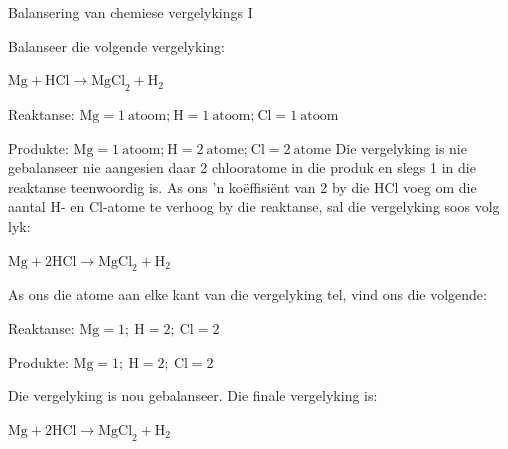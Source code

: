 \begin{wex}{Balansering van chemiese vergelykings I}{Balanseer die volgende vergelyking:
\begin{center}
${\text{Mg} + \text{HCl} \rightarrow \text{MgCl}_{2} + \text{H}_{2}}$\\
\end{center}
}
{

Reaktanse: $\text{Mg} = 1 ~\text{atoom;}~ \text{H} = 1 ~\text{atoom;}~ \text{Cl} = 1 ~\text{atoom}$

Produkte: $\text{Mg} = 1 ~\text{atoom;}~ \text{H} = 2 ~\text{atome;}~ \text{Cl} = 2 ~\text{atome}$
Die vergelyking is nie gebalanseer nie aangesien daar 2 chlooratome in die produk en slegs 1 in die reaktanse teenwoordig is. As ons 'n koëffisiënt van 2 by die HCl voeg om die aantal H- en Cl-atome te verhoog by die reaktanse, sal die vergelyking soos volg lyk:
\begin{center}
${\text{Mg} + 2\text{HCl} \rightarrow \text{MgCl}_{2} + \text{H}_{2}}$\\
\end{center}


As ons die atome aan elke kant van die vergelyking tel, vind ons die volgende:

Reaktanse: $\text{Mg} = 1;~ \text{H} = 2;~ \text{Cl} = 2$

Produkte: $\text{Mg} = 1;~ \text{H} = 2;~ \text{Cl} = 2$

Die vergelyking is nou gebalanseer. Die finale vergelyking is:
\begin{center}
${\text{Mg} + 2\text{HCl} \rightarrow \text{MgCl}_{2} + \text{H}_{2}}$
\end{center}
}
\end{wex}
    \noindent
\par
            \label{m38726*secfhsst!!!underscore!!!id394}
      \noindent
